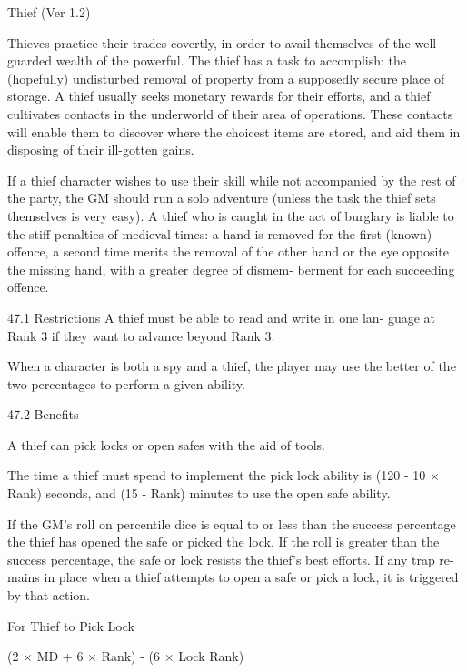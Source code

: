 \begin{Chapter}{Thief (Ver 1.2)}

Thieves  practice  their  trades  covertly,  in  order  to 
avail themselves of the well-guarded wealth of the 
powerful.  The  thief  has  a  task  to  accomplish:  the 
(hopefully) undisturbed removal of property from a 
supposedly secure place of storage. A thief usually 
seeks  monetary  rewards  for  their  efforts,  and  a 
thief  cultivates  contacts  in  the  underworld  of  their 
area of operations. These contacts will enable them 
to discover where the choicest items are stored, and 
aid them in disposing of their ill-gotten gains. 

If  a  thief  character  wishes  to  use  their  skill  while 
not  accompanied  by  the  rest  of  the  party,  the  GM 
should  run  a  solo  adventure  (unless  the  task  the 
thief  sets  themselves  is  very  easy).  A  thief  who  is 
caught  in  the  act  of  burglary  is  liable  to  the  stiff 
penalties of medieval times: a hand is removed for 
the first (known) offence, a second time merits the 
removal  of  the  other  hand  or  the  eye  opposite  the 
missing  hand,  with  a  greater  degree  of  dismem-
berment for each succeeding offence. 

47.1 Restrictions 
A  thief  must be  able  to  read  and  write  in  one  lan-
guage  at  Rank  3  if  they  want  to  advance  beyond 
Rank 3. 

When  a  character  is  both  a  spy  and  a  thief,  the 
player may use the better of the two percentages to 
perform a given ability. 

47.2 Benefits 

A thief can pick locks or open safes with the aid 
of tools. 

The time a thief must spend to implement the pick 
lock ability is (120 - 10 × Rank) seconds, and (15 - 
Rank) minutes to use the open safe ability. 

If  the  GM’s  roll  on  percentile  dice  is  equal  to  or 
less  than  the  success  percentage  the  thief  has 
opened  the  safe  or  picked  the  lock.  If  the  roll  is 
greater  than  the  success  percentage,  the  safe  or 
lock  resists  the  thief’s  best  efforts.  If  any  trap  re-
mains in place when a thief attempts to open a safe 
or pick a lock, it is triggered by that action. 

For Thief to Pick 
Lock 

(2 × MD + 6 × Rank)  - (6 × 
Lock Rank) 


\end{Chapter}
